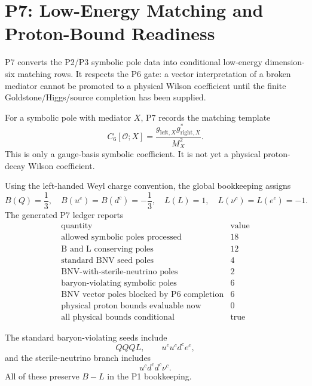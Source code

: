 \documentclass[11pt]{article}
\newcommand{\uc}{u^c}
\newcommand{\dc}{d^c}
\newcommand{\nuc}{\nu^c}
\newcommand{\ec}{e^c}
\begin{document}
\section{P7: Low-Energy Matching and Proton-Bound Readiness}

P7 converts the P2/P3 symbolic pole data into conditional low-energy
dimension-six matching rows.  It respects the P6 gate: a vector interpretation
of a broken mediator cannot be promoted to a physical Wilson coefficient until
the finite Goldstone/Higgs/source completion has been supplied.

For a symbolic pole with mediator $X$, P7 records the matching template
\begin{equation}
  C_6[\mathcal O;X]
  =
  \frac{g_{\mathrm{left},X}g_{\mathrm{right},X}^\ast}{M_X^2}.
\end{equation}
This is only a gauge-basis symbolic coefficient.  It is not yet a physical
proton-decay Wilson coefficient.

Using the left-handed Weyl charge convention, the global bookkeeping assigns
\begin{equation}
  B(Q)=\frac13,\quad B(\uc)=B(\dc)=-\frac13,\quad
  L(L)=1,\quad L(\nuc)=L(\ec)=-1.
\end{equation}
The generated P7 ledger reports
\begin{equation}
\begin{array}{c|c}
\text{quantity} & \text{value}\\
\hline
\text{allowed symbolic poles processed} & 18\\
\text{B and L conserving poles} & 12\\
\text{standard BNV seed poles} & 4\\
\text{BNV-with-sterile-neutrino poles} & 2\\
\text{baryon-violating symbolic poles} & 6\\
\text{BNV vector poles blocked by P6 completion} & 6\\
\text{physical proton bounds evaluable now} & 0\\
\text{all physical bounds conditional} & \text{true}
\end{array}
\end{equation}

The standard baryon-violating seeds include
\begin{equation}
  QQQL,\qquad \uc\uc\dc\ec,
\end{equation}
and the sterile-neutrino branch includes
\begin{equation}
  \uc\dc\dc\nuc.
\end{equation}
All of these preserve $B-L$ in the P1 bookkeeping.
\end{document}
